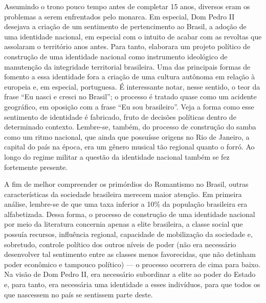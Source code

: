 Assumindo o trono pouco tempo antes de completar 15 anos, diversos eram os problemas a serem enfrentados pelo monarca. Em especial, Dom Pedro II desejava a criação de um sentimento de pertencimento ao Brasil, a adoção de uma identidade nacional, em especial com o intuito de acabar com as revoltas que assolaram o território anos antes. Para tanto, elaborara um projeto político de construção de uma identidade nacional como instrumento ideológico de manutenção da integridade territorial brasileira. Uma das principais formas de fomento a essa identidade fora a criação de uma cultura autônoma em relação à europeia e, em especial, portuguesa. É interessante notar, nesse sentido, o teor da frase ``Eu nasci e cresci no Brasil''; o processo é tratado quase como um acidente geográfico, em oposição com a frase ``Eu sou brasileiro''. Veja a forma como esse sentimento de identidade é fabricado, fruto de decisões políticas dentro de determinado contexto. Lembre-se, também, do processo de construção do samba como um ritmo nacional, que ainda que possuísse origens no Rio de Janeiro, a capital do país na época, era um gênero musical tão regional quanto o forró. Ao longo do regime militar a questão da identidade nacional também se fez fortemente presente.

A fim de melhor compreender os primórdios do Romantismo no Brasil, outras características da sociedade brasileira merecem maior atenção. Em primeira análise, lembre-se de que uma taxa inferior a 10\% da população brasileira era alfabetizada. Dessa forma, o processo de construção de uma identidade nacional por meio da literatura concernia apenas a elite brasileira, a classe social que possuía recursos, influência regional, capacidade de mobilização da sociedade e, sobretudo, controle político dos outros níveis de poder (não era necessário desenvolver tal sentimento entre as classes menos favorecidas, que não detinham poder econômico e tampouco político) — o processo ocorrera de cima para baixo. Na visão de Dom Pedro II, era necessário subordinar a elite ao poder do Estado e, para tanto, era necessária uma identidade a esses indivíduos, para que todos os que nascessem no país se sentissem parte deste.

